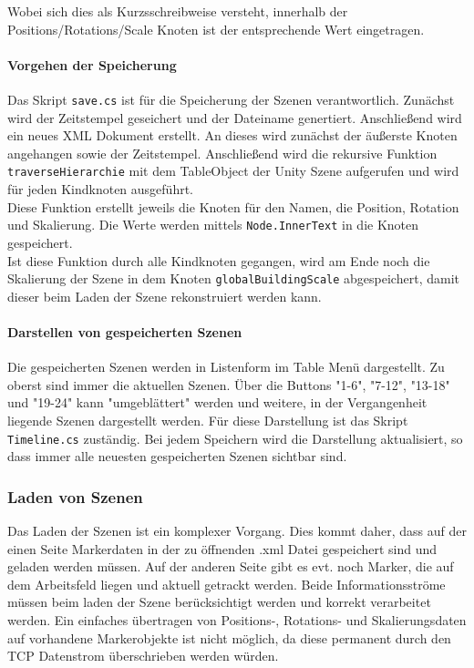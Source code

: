 Wobei sich dies als Kurzsschreibweise versteht, innerhalb der Positions/Rotations/Scale Knoten ist der entsprechende Wert eingetragen.

\paragraph{Vorgehen der Speicherung}
Das Skript \texttt{save.cs} ist für die Speicherung der Szenen verantwortlich. Zunächst wird der Zeitstempel geseichert und der Dateiname genertiert. Anschließend wird ein neues XML Dokument erstellt. An dieses wird zunächst der äußerste Knoten angehangen sowie der Zeitstempel. Anschließend wird die rekursive Funktion \texttt{traverseHierarchie} mit dem TableObject der Unity Szene aufgerufen und wird für jeden Kindknoten ausgeführt. \\
Diese Funktion erstellt jeweils die Knoten für den Namen, die Position, Rotation und Skalierung. Die Werte werden mittels \texttt{Node.InnerText} in die Knoten gespeichert.\\
Ist diese Funktion durch alle Kindknoten gegangen, wird am Ende noch die Skalierung der Szene in dem Knoten \texttt{globalBuildingScale} abgespeichert, damit dieser beim Laden der Szene rekonstruiert werden kann.

\paragraph{Darstellen von gespeicherten Szenen} Die gespeicherten Szenen werden in Listenform im Table Menü dargestellt. Zu oberst sind immer die aktuellen Szenen. Über die Buttons "1-6", "7-12", "13-18"  und "19-24" kann "umgeblättert" werden und weitere, in der Vergangenheit liegende Szenen dargestellt werden. Für diese Darstellung ist das Skript \texttt{Timeline.cs} zuständig. Bei jedem Speichern wird die Darstellung aktualisiert, so dass immer alle neuesten gespeicherten Szenen sichtbar sind.

\subsubsection{Laden von Szenen}
\label{Laden}
Das Laden der Szenen ist ein komplexer Vorgang. Dies kommt daher, dass auf der einen Seite Markerdaten in der zu öffnenden .xml Datei gespeichert sind und geladen werden müssen. Auf der anderen Seite gibt es evt. noch Marker, die auf dem Arbeitsfeld liegen und aktuell getrackt werden. Beide Informationsströme müssen beim laden der Szene berücksichtigt werden und korrekt verarbeitet werden. Ein einfaches übertragen von Positions-, Rotations- und Skalierungsdaten auf vorhandene Markerobjekte ist nicht möglich, da diese permanent durch den TCP Datenstrom überschrieben werden würden.
